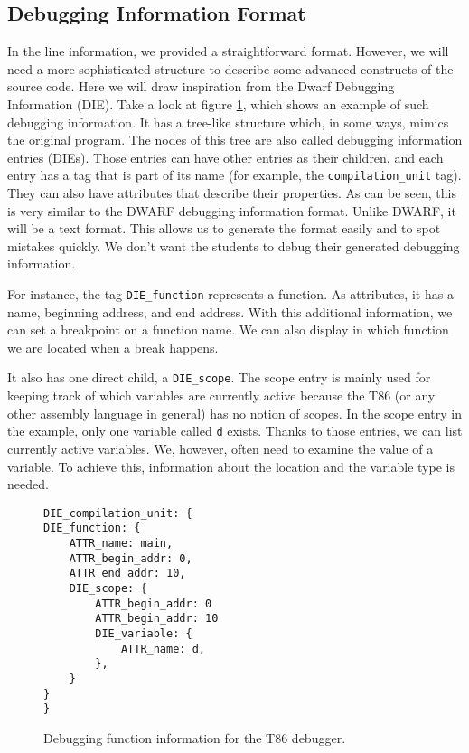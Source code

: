 \subsection{Debugging Information Format}
In the line information, we provided a straightforward format. However, we will
need a more sophisticated structure to describe some advanced constructs of the
source code. Here we will draw inspiration from the Dwarf Debugging Information
(DIE). Take a look at figure \ref{fig:t86dbg-die}, which shows an example of
such debugging information. It has a tree-like structure which, in some ways,
mimics the original program. The nodes of this tree are also called debugging
information entries (DIEs). Those entries can have other entries as their
children, and each entry has a tag that is part of its name (for example, the
\verb|compilation_unit| tag). They can also have attributes that describe their
properties. As can be seen, this is very similar to the DWARF debugging
information format. Unlike DWARF, it will be a text format. This allows us to
generate the format easily and to spot mistakes quickly. We don't want the
students to debug their generated debugging information.

For instance, the tag \verb|DIE_function| represents a function. As attributes,
it has a name, beginning address, and end address. With this additional
information, we can set a breakpoint on a function name. We can also display in
which function we are located when a break happens.

It also has one direct child, a \verb|DIE_scope|. The scope entry is mainly
used for keeping track of which variables are currently active because the T86
(or any other assembly language in general) has no notion of scopes. In the
scope entry in the example, only one variable called \texttt{d} exists. Thanks
to those entries, we can list currently active variables. We, however, often
need to examine the value of a variable. To achieve this, information about the
location and the variable type is needed.

\begin{figure}
    \begin{lstlisting}
DIE_compilation_unit: {
DIE_function: {
    ATTR_name: main,
    ATTR_begin_addr: 0,
    ATTR_end_addr: 10,
    DIE_scope: {
        ATTR_begin_addr: 0
        ATTR_begin_addr: 10
        DIE_variable: {
            ATTR_name: d,
        },
    }
}
}
    \end{lstlisting}
    \caption{Debugging function information for the T86 debugger.}
    \label{fig:t86dbg-die}
\end{figure}

